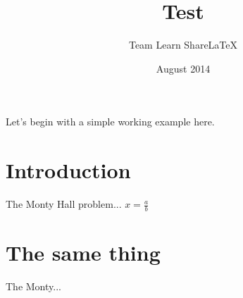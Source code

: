 \documentclass[red]{eqconf}
\title{Test}
\author{Team Learn ShareLaTeX}
\date{August 2014}
\begin{document}
 
\maketitle
 
\noindent
Let's begin with a simple working example here.
 
\blindtext
 
\section{Introduction}
 
The Monty Hall problem...
$x=\frac{a}{b}$
 
\section{The same thing}
 
The Monty...
\end{document}
